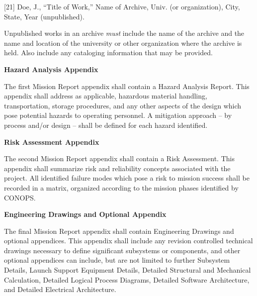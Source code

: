 \documentclass[
]{article}
\begin{document}
{[}21{]} Doe, J., ``Title of Work,'' Name of Archive, Univ. (or
organization), City, State, Year (unpublished).

Unpublished works in an archive \emph{must} include the name of the
archive and the name and location of the university or other
organization where the archive is held. Also include any cataloging
information that may be provided.

\textbf{\hfill\break
}

\textbf{Hazard Analysis Appendix}

The first Mission Report appendix shall contain a Hazard Analysis
Report. This appendix shall address as applicable, hazardous material
handling, transportation, storage procedures, and any other aspects of
the design which pose potential hazards to operating personnel. A
mitigation approach -- by process and/or design -- shall be defined for
each hazard identified.

\textbf{\hfill\break
}

\textbf{Risk Assessment Appendix}

The second Mission Report appendix shall contain a Risk Assessment. This
appendix shall summarize risk and reliability concepts associated with
the project. All identified failure modes which pose a risk to mission
success shall be recorded in a matrix, organized according to the
mission phases identified by CONOPS.

\textbf{\hfill\break
}

\textbf{Engineering Drawings and Optional Appendix}

The final Mission Report appendix shall contain Engineering Drawings and
optional appendices. This appendix shall include any revision controlled
technical drawings necessary to define significant subsystems or
components, and other optional appendices can include, but are not
limited to further Subsystem Details, Launch Support Equipment Details,
Detailed Structural and Mechanical Calculation, Detailed Logical Process
Diagrams, Detailed Software Architecture, and Detailed Electrical
Architecture.
\end{document}
